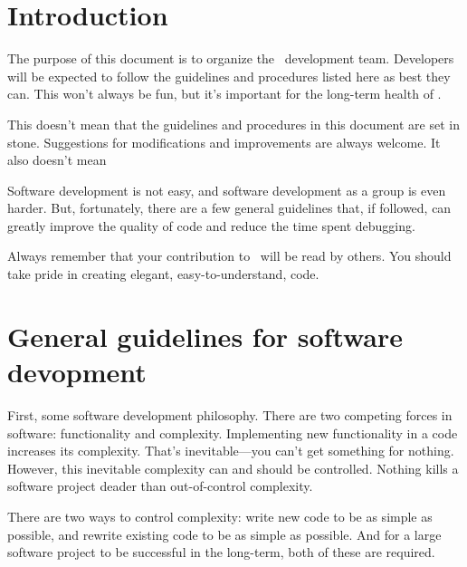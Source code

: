 \documentclass{article}
\begin{document}

\tableofcontents

\section{Introduction} \label{s:intro}

The purpose of this document is to organize the \cello\ development
team.  Developers will be expected to follow the guidelines and
procedures listed here as best they can.  This won't always be fun,
but it's important for the long-term health of \cello.  

This doesn't mean that the guidelines and procedures in this document
are set in stone.  Suggestions for modifications and improvements are
always welcome.  It also doesn't mean

Software development is not easy, and software development as a group
is even harder.  But, fortunately, there are a few general guidelines
that, if followed, can greatly improve the quality of code and reduce
the time spent debugging.

Always remember that your contribution to \cello\ will be read by
others.  You should take pride in creating elegant,
easy-to-understand, code.

\section{General guidelines for software devopment}

First, some software development philosophy.  There are two competing
forces in software: functionality and complexity.  Implementing new
functionality in a code increases its complexity.  That's
inevitable---you can't get something for nothing.  However, this
inevitable complexity can and should be controlled.  Nothing kills a
software project deader than out-of-control complexity.

There are two ways to control complexity: write new code to be as
simple as possible, and rewrite existing code to be as simple as
possible.  And for a large software project to be successful in the
long-term, both of these are required.
\end{document}
